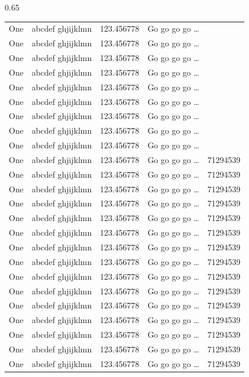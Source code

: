 \documentclass[phd,showframe]{ndsu-thesis-2022}
\begin{document}
\begin{spacing}{0.65}
\begin{longtable}{@{\:} p{1in} p{1.45in} p{1in} p{1.3in} p{1in} @{\:}}
One & abcdef ghjijklmn & 123.456778  & Go go go go \ldots \\
One & abcdef ghjijklmn & 123.456778  & Go go go go \ldots \\
One & abcdef ghjijklmn & 123.456778  & Go go go go \ldots \\
One & abcdef ghjijklmn & 123.456778  & Go go go go \ldots \\
One & abcdef ghjijklmn & 123.456778  & Go go go go \ldots \\
One & abcdef ghjijklmn & 123.456778  & Go go go go \ldots \\
One & abcdef ghjijklmn & 123.456778  & Go go go go \ldots \\
One & abcdef ghjijklmn & 123.456778  & Go go go go \ldots \\
One & abcdef ghjijklmn & 123.456778  & Go go go go \ldots \\
One & abcdef ghjijklmn & 123.456778  & Go go go go \ldots & \num{71294539}\\
One & abcdef ghjijklmn & 123.456778  & Go go go go \ldots & \num{71294539}\\
One & abcdef ghjijklmn & 123.456778  & Go go go go \ldots & \num{71294539}\\
One & abcdef ghjijklmn & 123.456778  & Go go go go \ldots & \num{71294539}\\
One & abcdef ghjijklmn & 123.456778  & Go go go go \ldots & \num{71294539}\\
One & abcdef ghjijklmn & 123.456778  & Go go go go \ldots & \num{71294539}\\
One & abcdef ghjijklmn & 123.456778  & Go go go go \ldots & \num{71294539}\\
One & abcdef ghjijklmn & 123.456778  & Go go go go \ldots & \num{71294539}\\
One & abcdef ghjijklmn & 123.456778  & Go go go go \ldots & \num{71294539}\\
One & abcdef ghjijklmn & 123.456778  & Go go go go \ldots & \num{71294539}\\
One & abcdef ghjijklmn & 123.456778  & Go go go go \ldots & \num{71294539}\\
One & abcdef ghjijklmn & 123.456778  & Go go go go \ldots & \num{71294539}\\
One & abcdef ghjijklmn & 123.456778  & Go go go go \ldots & \num{71294539}\\
One & abcdef ghjijklmn & 123.456778  & Go go go go \ldots & \num{71294539}\\
One & abcdef ghjijklmn & 123.456778  & Go go go go \ldots & \num{71294539}\\

\end{longtable}
\end{spacing}
\end{document}
